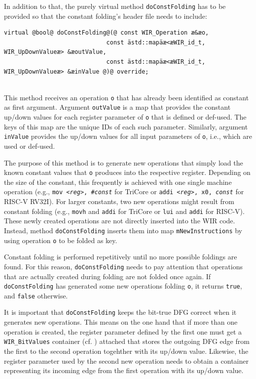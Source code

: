 In addition to that, the purely virtual method \texttt{doConstFolding} has to be provided so that the constant folding's header file needs to include: \\
\begin{lstlisting}[style=code,float=!ht,aboveskip=-0.8 \baselineskip,belowskip=-0.8 \baselineskip]
virtual @bool@ doConstFolding@(@ const WIR_Operation æ&æo,
                             const ästd::mapäæ<æWIR_id_t, WIR_UpDownValueæ> &æoutValue,
                             const ästd::mapäæ<æWIR_id_t, WIR_UpDownValueæ> &æinValue @)@ override;
\end{lstlisting}
\\
This method receives an operation \texttt{o} that has already been identified as constant as first argument.
Argument \texttt{outValue} is a map that provides the constant up/down values for each register parameter of \texttt{o} that is defined or def-used.
The keys of this map are the unique IDs of each such parameter.
Similarly, argument \texttt{inValue} provides the up/down values for all input parameters of \texttt{o}, i.e., which are used or def-used.

The purpose of this method is to generate new operations that simply load the known constant values that \texttt{o} produces into the respective register.
Depending on the size of the constant, this frequently is achieved with one single machine operation (e.g., \texttt{mov {\itshape <reg>}, {\itshape \#const}} for TriCore or \texttt{addi {\itshape <reg>}, x0, {\itshape const}} for RISC-V RV32I).
For larger constants, two new operations might result from constant folding (e.g., \texttt{movh} and \texttt{addi} for TriCore or \texttt{lui} and \texttt{addi} for RISC-V).
These newly created operations are not directly inserted into the \gls{WIR} code.
Instead, method \texttt{doConstFolding} inserts them into map \texttt{mNewInstructions} by using operation \texttt{o} to be folded as key.

Constant folding is performed repetitively until no more possible foldings are found.
For this reason, \texttt{doConst\-Folding} needs to pay attention that operations that are actually created during folding are not folded once again.
If \texttt{doConstFolding} has generated some new operations folding \texttt{o}, it returns \texttt{true}, and \texttt{false} otherwise.

It is important that \texttt{doConstFolding} keeps the bit-true \gls{DFG} correct when it generates new operations.
This means on the one hand that if more than one operation is created, the register parameter defined by the first one must get a \texttt{WIR\_BitValues} container (cf. ) attached that stores the outgoing \gls{DFG} edge from the first to the second operation togehther with its up/down value.
Likewise, the register parameter used by the second new operation needs to obtain a container representing its incoming edge from the first operation with its up/down value.


